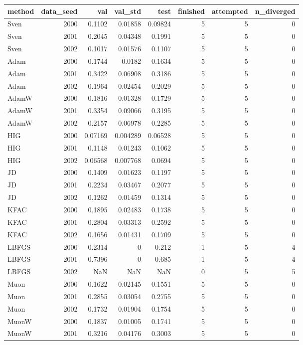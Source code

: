 \begin{tabular}{lrrrrrrr}
\toprule
method & data\_seed & val & val\_std & test & finished & attempted & n\_diverged \\
\midrule
Sven & 2000 & 0.1102 & 0.01858 & 0.09824 & 5 & 5 & 0 \\
Sven & 2001 & 0.2045 & 0.04348 & 0.1991 & 5 & 5 & 0 \\
Sven & 2002 & 0.1017 & 0.01576 & 0.1107 & 5 & 5 & 0 \\
Adam & 2000 & 0.1744 & 0.0182 & 0.1634 & 5 & 5 & 0 \\
Adam & 2001 & 0.3422 & 0.06908 & 0.3186 & 5 & 5 & 0 \\
Adam & 2002 & 0.1964 & 0.02454 & 0.2029 & 5 & 5 & 0 \\
AdamW & 2000 & 0.1816 & 0.01328 & 0.1729 & 5 & 5 & 0 \\
AdamW & 2001 & 0.3354 & 0.09066 & 0.3195 & 5 & 5 & 0 \\
AdamW & 2002 & 0.2157 & 0.06978 & 0.2285 & 5 & 5 & 0 \\
HIG & 2000 & 0.07169 & 0.004289 & 0.06528 & 5 & 5 & 0 \\
HIG & 2001 & 0.1148 & 0.01243 & 0.1062 & 5 & 5 & 0 \\
HIG & 2002 & 0.06568 & 0.007768 & 0.0694 & 5 & 5 & 0 \\
JD & 2000 & 0.1409 & 0.01623 & 0.1197 & 5 & 5 & 0 \\
JD & 2001 & 0.2234 & 0.03467 & 0.2077 & 5 & 5 & 0 \\
JD & 2002 & 0.1262 & 0.01459 & 0.1314 & 5 & 5 & 0 \\
KFAC & 2000 & 0.1895 & 0.02483 & 0.1738 & 5 & 5 & 0 \\
KFAC & 2001 & 0.2804 & 0.03313 & 0.2592 & 5 & 5 & 0 \\
KFAC & 2002 & 0.1656 & 0.01431 & 0.1709 & 5 & 5 & 0 \\
LBFGS & 2000 & 0.2314 & 0 & 0.212 & 1 & 5 & 4 \\
LBFGS & 2001 & 0.7396 & 0 & 0.685 & 1 & 5 & 4 \\
LBFGS & 2002 & NaN & NaN & NaN & 0 & 5 & 5 \\
Muon & 2000 & 0.1622 & 0.02145 & 0.1551 & 5 & 5 & 0 \\
Muon & 2001 & 0.2855 & 0.03054 & 0.2755 & 5 & 5 & 0 \\
Muon & 2002 & 0.1732 & 0.01904 & 0.1754 & 5 & 5 & 0 \\
MuonW & 2000 & 0.1837 & 0.01005 & 0.1741 & 5 & 5 & 0 \\
MuonW & 2001 & 0.3216 & 0.04176 & 0.3003 & 5 & 5 & 0 \\

\end{tabular}
